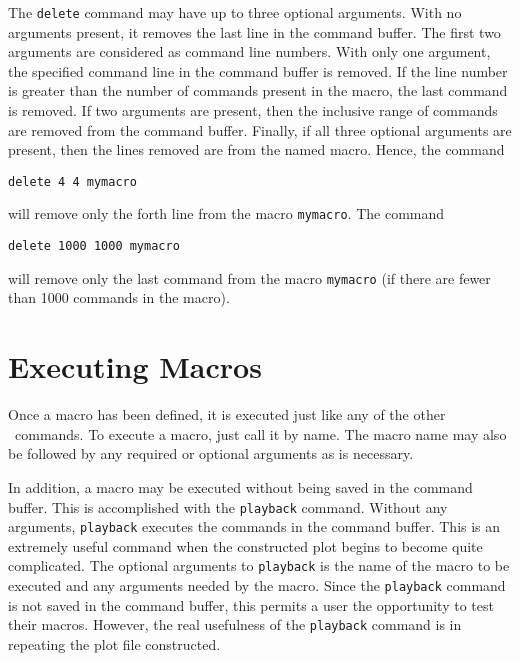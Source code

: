 The {\tt delete} command may have up to three optional arguments.
With no arguments present, it removes the last line in the command buffer.
The first two arguments are considered as command line numbers.
With only one argument, the specified command line in the command buffer
is removed.
If the line number is greater than the number of commands present in the
macro, the last command is removed.
If two arguments are present, then the inclusive range of commands are
removed from the command buffer.
Finally, if all three optional arguments are present, then the lines
removed are from the named macro.
Hence, the command
\begin{wiplist}%
  \item [\wipp] {\tt delete 4 4 mymacro}
\end{wiplist}
will remove only the forth line from the macro {\tt mymacro}.
The command
\begin{wiplist}%
  \item [\wipp] {\tt delete 1000 1000 mymacro}
\end{wiplist}
will remove only the last command from the macro {\tt mymacro} (if there
are fewer than 1000 commands in the macro).

\section		{Executing Macros}

Once a macro has been defined, it is executed just like any
of the other \wip\ commands.
To execute a macro, just call it by name.
The macro name may also be followed by any required or
optional arguments as is necessary.

In addition, a macro may be executed without being
saved in the command buffer.
This is accomplished with the
{\tt playback}%
command.
Without any arguments,
{\tt playback} executes the commands in the command buffer.
This is an extremely useful command when the constructed plot
begins to become quite complicated.
The optional arguments to {\tt playback} is the name of the macro
to be executed and any arguments needed by the macro.
Since the {\tt playback} command is not saved in the command buffer,
this permits a user the opportunity to test their macros.
However, the real usefulness of the {\tt playback} command is in
repeating the plot file constructed.

